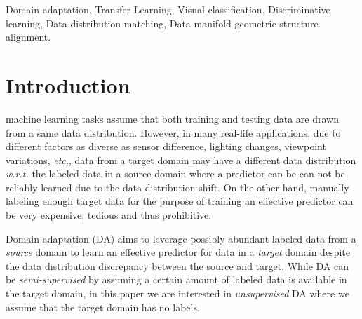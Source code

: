 \documentclass[journal,twocolumn]{IEEEtran}
\begin{document}
\begin{CJK*}{UTF8}{gkai}
\begin{IEEEkeywords}
Domain adaptation, Transfer Learning, Visual classification, Discriminative learning, Data distribution matching, Data manifold geometric structure alignment.
\end{IEEEkeywords}






%
\IEEEpeerreviewmaketitle



\section{Introduction}

 machine learning tasks assume that both training and testing data are drawn from a same data distribution\cite{pan2010survey,7078994,DBLP:journals/corr/Csurka17}. However, in many real-life applications, due to different factors as diverse as sensor difference, lighting changes, viewpoint variations, \textit{etc.}, data from a target domain may have a different data distribution \textit{w.r.t.} the labeled data in a source domain where a predictor can be  can not be reliably learned due to the data distribution shift. On the other hand, manually labeling enough target data for the purpose of training an effective predictor can be very expensive, tedious and thus prohibitive.  
    
    Domain adaptation (DA) \cite{pan2010survey,7078994,DBLP:journals/corr/Csurka17} aims to leverage possibly abundant labeled data from a \textit{source} domain to learn an effective predictor for data in a \textit{target} domain despite the data distribution discrepancy between the source and target. While DA can be \textit{semi-supervised} by assuming a certain amount of labeled data is available in the target domain, in this paper we are interested in \textit{unsupervised} DA\cite{DBLP:conf/icml/SaitoUH17} where we assume that the target domain has no labels. 
    

\end{CJK*}
\end{document}
